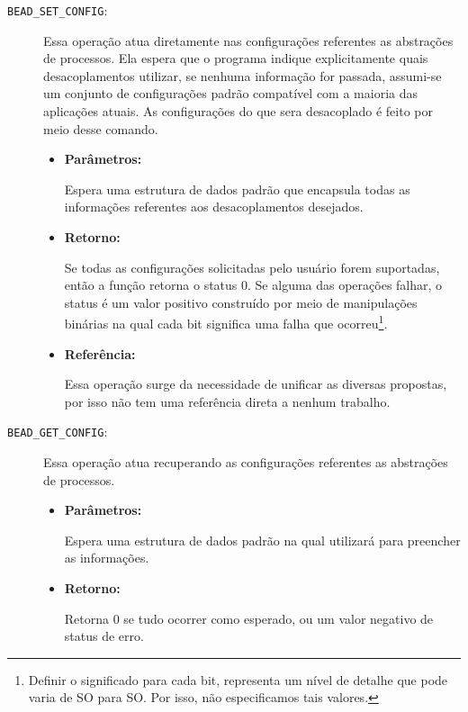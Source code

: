 \begin{description}
  \item [\texttt{BEAD\_SET\_CONFIG}:]

Essa operação atua diretamente nas configurações referentes as abstrações de
processos. Ela espera que o programa indique explicitamente quais
desacoplamentos utilizar, se nenhuma informação for passada, assumi-se um
conjunto de configurações padrão compatível com a maioria das aplicações
atuais. As configurações do que sera desacoplado é feito por meio desse comando.

  \begin{itemize}
    \item \textbf{Parâmetros:}

Espera uma estrutura de dados padrão que encapsula todas as informações
referentes aos desacoplamentos desejados.

    \item \textbf{Retorno:}

Se todas as configurações solicitadas pelo usuário forem suportadas, então a
função retorna o status 0. Se alguma das operações falhar, o status é um valor
positivo construído por meio de manipulações binárias na qual cada bit
significa uma falha que ocorreu\footnote{Definir o significado para cada bit,
representa um nível de detalhe que pode varia de SO para SO. Por isso, não
especificamos tais valores.}. 

    \item \textbf{Referência:}

Essa operação surge da necessidade de unificar as diversas propostas, por isso
não tem uma referência direta a nenhum trabalho.

	\end{itemize}

  \item [\texttt{BEAD\_GET\_CONFIG}:]

Essa operação atua recuperando as configurações referentes as abstrações de
processos. 

  \begin{itemize}
    \item \textbf{Parâmetros:}

Espera uma estrutura de dados padrão na qual utilizará para preencher as
informações.

    \item \textbf{Retorno:}

Retorna 0 se tudo ocorrer como esperado, ou um valor negativo de status de
erro.


\end{itemize}
\end{description}
